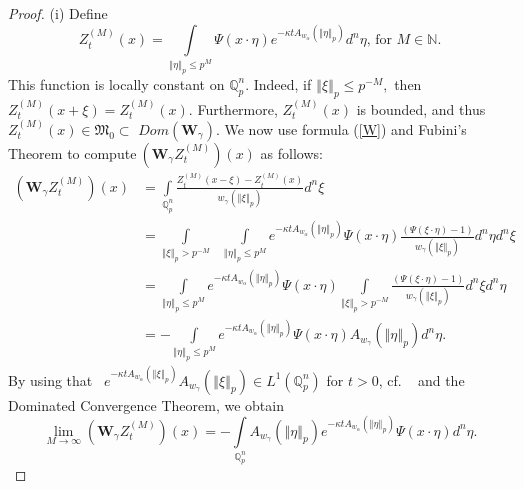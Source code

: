 \documentclass{amsart}\usepackage{amsfonts}
\theoremstyle{plain}
\numberwithin{equation}{section}
\begin{document}
\begin{proof}
(i) Define
\begin{equation}
Z_{t}^{(M)}(x)=\underset{\left\Vert \eta\right\Vert _{p}\leq p^{M}}{\int}\Psi(x\cdot\eta)e^{-\kappa tA_{w_{\alpha}}(\left\Vert \eta\right\Vert _{p})}d^{n}\eta\text{,\ for\ }M\in\mathbb{N}\text{.} \label{Z(M)}\end{equation}
This function is locally constant on $\mathbb{Q}_{p}^{n}$. Indeed, if
$\left\Vert \xi\right\Vert _{p}\leq p^{-M},$ then $Z_{t}^{(M)}(x+\xi
)=Z_{t}^{(M)}(x)$. Furthermore, $Z_{t}^{(M)}(x)$ is bounded, and thus
$Z_{t}^{(M)}(x)\in\mathcal{\mathfrak{M}}_{0}\subset$ $Dom(\boldsymbol{W}_{\gamma})$. We now use formula (\ref{W}) and Fubini's Theorem to
compute$\ (\mathbf{W}_{\gamma}Z_{t}^{(M)})(x)$ as follows:
\begin{align*}
(\mathbf{W}_{\gamma}Z_{t}^{(M)})(x)  &  =\underset{\mathbb{Q}_{p}^{n}}{\int
}\frac{Z_{t}^{(M)}(x-\xi)-Z_{t}^{(M)}(x)}{w_{\gamma}(\left\Vert \xi\right\Vert
_{p})}d^{n}\xi\\
&  =\underset{\left\Vert \xi\right\Vert _{p}>p^{-M}}{\int}\text{ }\underset{\left\Vert \eta\right\Vert _{p}\leq p^{M}}{\int}e^{-\kappa
tA_{w_{\alpha}}(\left\Vert \eta\right\Vert _{p})}\Psi(x\cdot\eta)\frac{\left(
\Psi(\xi\cdot\eta)-1\right)  }{w_{\gamma}(\left\Vert \xi\right\Vert _{p})}d^{n}\eta d^{n}\xi\\
&  =\underset{\left\Vert \eta\right\Vert _{p}\leq p^{M}}{\int}e^{-\kappa
tA_{w_{\alpha}}(\left\Vert \eta\right\Vert _{p})}\Psi(x\cdot\eta
)\underset{\left\Vert \xi\right\Vert _{p}>p^{-M}}{\int}\frac{\left(  \Psi
(\xi\cdot\eta)-1\right)  }{w_{\gamma}(\left\Vert \xi\right\Vert _{p})}d^{n}\xi
d^{n}\eta\\
&  =-\underset{\left\Vert \eta\right\Vert _{p}\leq p^{M}}{\int}e^{-\kappa
tA_{w_{\alpha}}(\left\Vert \eta\right\Vert _{p})}\Psi(x\cdot\eta)A_{w_{\gamma
}}(\left\Vert \eta\right\Vert _{p})d^{n}\eta.
\end{align*}
By using that \ $e^{-\kappa tA_{w_{\alpha}}(\left\Vert \xi\right\Vert _{p})}A_{w_{\gamma}}(\left\Vert \xi\right\Vert _{p})\in L^{1}(\mathbb{Q}_{p}^{n})$
for $t>0$, cf. \ \cite[Lemma 3.4]{Ch-Z} and the Dominated Convergence Theorem,
we obtain
\begin{equation}
\lim_{M\rightarrow\infty}(\mathbf{W}_{\gamma}Z_{t}^{(M)})(x)=-\underset
{\mathbb{Q}_{p}^{n}}{\int}A_{w_{\gamma}}(\left\Vert \eta\right\Vert
_{p})e^{-\kappa tA_{w_{\alpha}}(\left\Vert \eta\right\Vert _{p})}\Psi
(x\cdot\eta)d^{n}\eta. \label{WZ(M)}\end{equation}

\end{proof}
\end{document}
